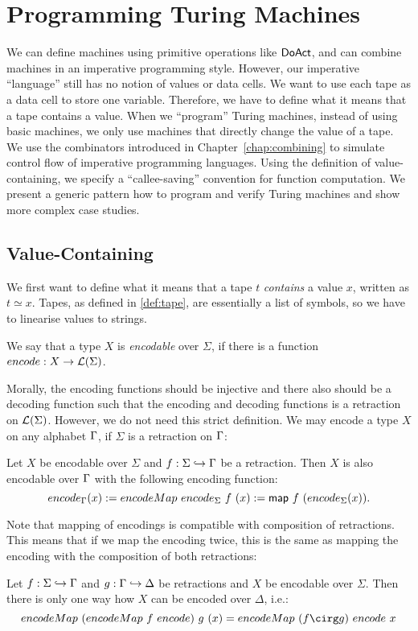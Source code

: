 \chapter{Programming Turing Machines}
\label{chap:programming}

We can define machines using primitive operations like $\textsf{DoAct}$, and can combine machines in an imperative programming style.  However, our
imperative ``language'' still has no notion of values or data cells.  We want to use each tape as a data cell to store one variable.  Therefore, we
have to define what it means that a tape contains a value.  When we ``program'' Turing machines, instead of using basic machines, we only use machines
that directly change the value of a tape.  We use the combinators introduced in Chapter~\ref{chap:combining} to simulate control flow of imperative
programming languages.  Using the definition of value-containing, we specify a ``callee-saving'' convention for function computation.  We present a
generic pattern how to program and verify Turing machines and show more complex case studies.


\section{Value-Containing}
\label{sec:value-containing}

We first want to define what it means that a tape $t$ \emph{contains} a value $x$, written as $t \simeq x$.  Tapes, as defined in \ref{def:tape}, are
essentially a list of symbols, so we have to linearise values to strings.

\begin{definition}
  We say that a type $X$ is \emph{encodable} over $\Sigma$, if there is a function $encode : X \rightarrow \mathcal{L}(\Sigma)$.
\end{definition}

Morally, the encoding functions should be injective and there also should be a decoding function such that the encoding and decoding functions is a
retraction on $\mathcal{L}(\Sigma)$.  However, we do not need this strict definition.  We may encode a type $X$ on any alphabet $\Gamma$, if $\Sigma$ is a
retraction on $\Gamma$:
\begin{definition}
  \label{def:Encode_map}
  Let $X$ be encodable over $\Sigma$ and $f : \Sigma \hookrightarrow \Gamma$ be a retraction.  Then $X$ is also encodable over $\Gamma$ with the following
  encoding function:
  \[ encode_\Gamma(x) := encodeMap~encode_\Sigma~f~(x) := \textsf{map}~f~(encode_\Sigma(x)). \]
\end{definition}
Note that mapping of encodings is compatible with composition of retractions.  This means that if we map the encoding twice, this is the same as
mapping the encoding with the composition of both retractions:
\begin{lemma}
  \label{lem:Encode_map_comp}
  Let $f : \Sigma \hookrightarrow \Gamma$ and $g : \Gamma \hookrightarrow \Delta$ be retractions and $X$ be encodable over $\Sigma$.  Then there is only
  one way how $X$ can be encoded over $\Delta$, i.e.:
  \[ encodeMap~(encodeMap~f~encode)~g~(x) = encodeMap~(f \cirg g)~encode~x \]
\end{lemma}


